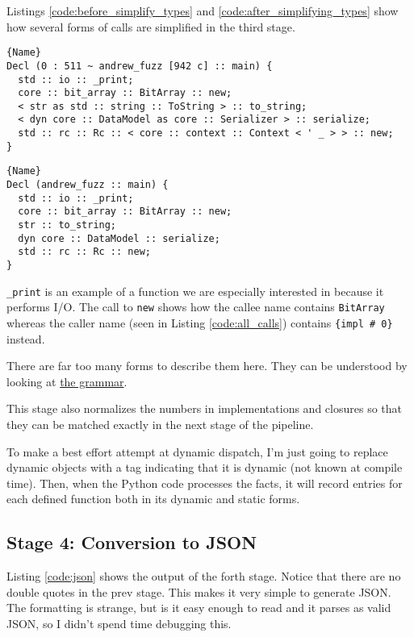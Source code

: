 \documentclass[11pt]{article}
\begin{document}
Listings \ref{code:before_simplify_types} and \ref{code:after_simplifying_types} show how several forms of calls are simplified in the third stage.

\begin{lstlisting}[caption=Before Simplifying Types, label=code:before_simplify_types]{Name}
Decl (0 : 511 ~ andrew_fuzz [942 c] :: main) {
  std :: io :: _print;
  core :: bit_array :: BitArray :: new;
  < str as std :: string :: ToString > :: to_string;
  < dyn core :: DataModel as core :: Serializer > :: serialize;
  std :: rc :: Rc :: < core :: context :: Context < ' _ > > :: new;
}
\end{lstlisting}
\begin{lstlisting}[caption=After Simplifying Types, label=code:after_simplifying_types]{Name}
Decl (andrew_fuzz :: main) {
  std :: io :: _print;
  core :: bit_array :: BitArray :: new;
  str :: to_string;
  dyn core :: DataModel :: serialize;
  std :: rc :: Rc :: new;
}
\end{lstlisting}

\lstinline{_print} is an example of a function we are especially interested in because it performs I/O.
The call to \lstinline{new} shows how the callee name contains \lstinline{BitArray} whereas the caller name (seen in Listing \ref{code:all_calls}) contains \lstinline|{impl # 0}| instead.

There are far too many forms to describe them here.
They can be understood by looking at \href{https://github.com/Andrew-Fryer/external_function_annotation/blob/master/simplify_types.txl#L49}{the grammar}.

This stage also normalizes the numbers in implementations and closures so that they can be matched exactly in the next stage of the pipeline.

To make a best effort attempt at dynamic dispatch, I'm just going to replace dynamic objects with a tag indicating that it is dynamic (not known at compile time).
Then, when the Python code processes the facts, it will record entries for each defined function both in its dynamic and static forms.

\subsection{Stage 4: Conversion to JSON}

Listing \ref{code:json} shows the output of the forth stage.
Notice that there are no double quotes in the prev stage.
This makes it very simple to generate JSON.
The formatting is strange, but is it easy enough to read and it parses as valid JSON, so I didn't spend time debugging this.
\end{document}
